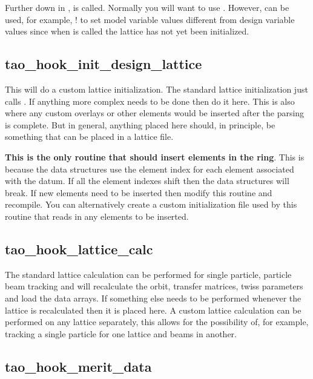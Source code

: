 {Further down in ,  is called. Normally you will want to
use . However,  can be used, for example, ! to set
model variable values different from design variable values since when 
is called the  lattice has not yet been initialized.

\subsection{tao_hook_init_design_lattice}

This will do a custom lattice initialization. The standard lattice initialization just calls
. If anything more complex needs to be done then do it here. This is also where any
custom overlays or other elements would be inserted after the parsing is complete. But in general,
anything placed here should, in principle, be something that can be placed in a lattice file.

\textbf{This is the only routine that should insert elements in the ring}. This is because the \tao
data structures use the element index for each element associated with the datum. If all the element
indexes shift then the data structures will break. If new elements need to be inserted then modify
this routine and recompile. You can alternatively create a custom initialization file used by this
routine that reads in any elements to be inserted.

\subsection{tao_hook_lattice_calc}

The standard lattice calculation can be performed for single particle, particle beam tracking and
will recalculate the orbit, transfer matrices, twiss parameters and load the data arrays. If
something else needs to be performed whenever the lattice is recalculated then it is placed here. A
custom lattice calculation can be performed on any lattice separately, this allows for the
possibility of, for example, tracking a single particle for one lattice and beams in another.

\subsection{tao_hook_merit_data}

}

